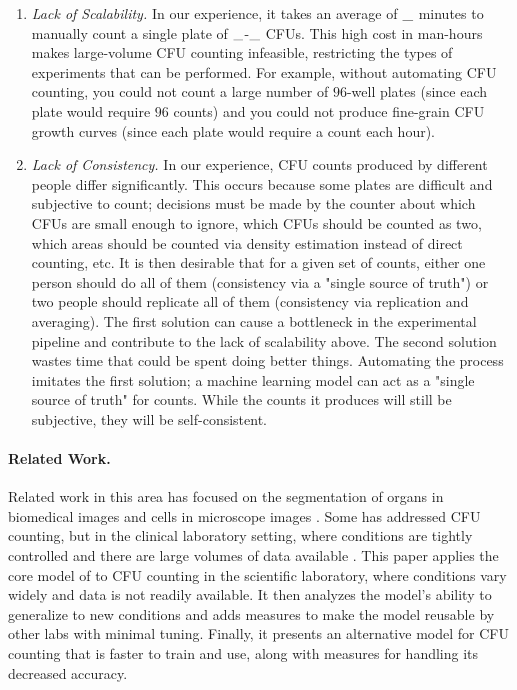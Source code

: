 \documentclass[10pt,letterpaper]{article}
\newcommand{\fillin}[1]{
    \IfEqCase{#1}{%
        {short}{\_}%
        {long}{\_\_\_\_\_}%
    }[\PackageError{fillin}{Undefined option to fillin: #1}{}]
}
\begin{document}
    \begin{enumerate}
        \item \textit{Lack of Scalability.}
            In our experience, it takes an average of $\fillin{short}$ minutes to manually count a single plate of $\fillin{short}$-$\fillin{short}$ CFUs. This high cost in man-hours makes large-volume CFU counting infeasible, restricting the types of experiments that can be performed. For example, without automating CFU counting, you could not count a large number of $96$-well plates (since each plate would require $96$ counts) and you could not produce fine-grain CFU growth curves (since each plate would require a count each hour).
        
        \item \textit{Lack of Consistency.}
            In our experience, CFU counts produced by different people differ significantly. This occurs because some plates are difficult and subjective to count; decisions must be made by the counter about which CFUs are small enough to ignore, which CFUs should be counted as two, which areas should be counted via density estimation instead of direct counting, etc. It is then desirable that for a given set of counts, either one person should do all of them (consistency via a "single source of truth") or two people should replicate all of them (consistency via replication and averaging). The first solution can cause a bottleneck in the experimental pipeline and contribute to the lack of scalability above. The second solution wastes time that could be spent doing better things. Automating the process imitates the first solution; a machine learning model can act as a "single source of truth" for counts. While the counts it produces will still be subjective, they will be self-consistent.
    \end{enumerate}
    
    \paragraph*{Related Work.}
        Related work in this area has focused on the segmentation of organs in biomedical images \cite{Novikov, Ronneberger} and cells in microscope images \cite{Valen}. Some has addressed CFU counting, but in the clinical laboratory setting, where conditions are tightly controlled and there are large volumes of data available \cite{Ferrari}. This paper applies the core model of \cite{Valen} to CFU counting in the scientific laboratory, where conditions vary widely and data is not readily available. It then analyzes the model's ability to generalize to new conditions and adds measures to make the model reusable by other labs with minimal tuning. Finally, it presents an alternative model for CFU counting that is faster to train and use, along with measures for handling its decreased accuracy.
\end{document}
